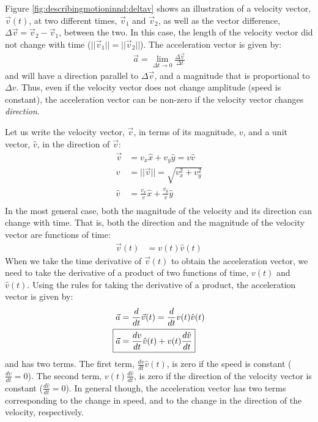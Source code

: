 Figure \ref{fig:describingmotioninnd:deltav} shows an illustration of a velocity vector, $\vec v(t)$, at two different times, $\vec v_1$ and $\vec v_2$, as well as the vector difference, $\Delta \vec v=\vec v_2 - \vec v_1$, between the two. In this case, the length of the velocity vector did not change with time ($||\vec v_1||=||\vec v_2||$). The acceleration vector is given by:
\begin{align*}
\vec a = \lim_{\Delta t\to 0}\frac{\Delta \vec v}{\Delta t}
\end{align*}
and will have a direction parallel to $\Delta \vec v$, and a magnitude that is proportional to $\Delta v$. Thus, even if the velocity vector does not change amplitude (speed is constant), the acceleration vector can be non-zero if the velocity vector changes \textit{direction}.

Let us write the velocity vector, $\vec v$, in terms of its magnitude, $v$, and a unit vector, $\hat v$, in the direction of $\vec v$:
\begin{align*}
\vec v &=v_x\hat x+v_y\hat y= v \hat v\\
v&=||\vec v||=\sqrt{v_x^2+v_y^2}\\
\hat v &= \frac{v_x}{v}\hat x+\frac{v_y}{v}\hat y\\
\end{align*}
In the most general case, both the magnitude of the velocity and its direction can change with time. That is, both the direction and the magnitude of the velocity vector are functions of time:
\begin{align*}
\vec v(t)&=v(t)\hat v(t)
\end{align*}
When we take the time derivative of $\vec v(t)$ to obtain the acceleration vector, we need to take the derivative of a product of two functions of time, $v(t)$ and $\hat v(t)$. Using the rules for taking the derivative of a product, the acceleration vector is given by:
\begin{align}
\label{eqn:describingmotioninnd:avecdef2}
\vec a &= \frac{d}{dt}\vec v(t)= \frac{d}{dt}v(t)\hat v(t)\nonumber\\
\Aboxed{\vec a&=\frac{dv}{dt}\hat v(t)+v(t)\frac{d\hat v}{dt}}
\end{align}
and has two terms. The first term, $\frac{dv}{dt}\hat v(t)$, is zero if the speed is constant ($\frac{dv}{dt}=0$). The second term, $v(t)\frac{d\hat v}{dt}$, is zero if the direction of the velocity vector is constant ($\frac{d\hat v}{dt}=0$). In general though, the acceleration vector has two terms corresponding to the change in speed, and to the change in the direction of the velocity, respectively.

